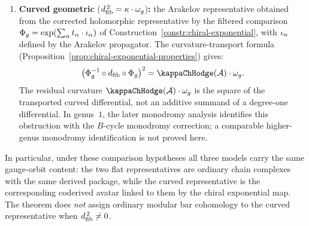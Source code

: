 \begin{theorem}
\begin{enumerate}[label=\textup{(\roman*)}]
\item \textbf{Curved geometric}
 \textup{(}$d_{\mathrm{fib}}^{\,2} = \kappa \cdot \omega_g$\textup{)}\textbf{:}
 the Arakelov representative obtained from the corrected
 holomorphic representative by the filtered comparison
 $\Phi_g = \exp(\sum_\alpha t_\alpha \cdot \iota_\alpha)$ of
 Construction~\textup{\ref{constr:chiral-exponential}},
 with $\iota_\alpha$ defined by the Arakelov propagator.
 The curvature-transport formula
 \textup{(}Proposition~\textup{\ref{prop:chiral-exponential-properties}}\textup{)}
 gives:
 \[
 \bigl(\Phig^{-1} \circ \dfib \circ \Phig\bigr)^2
 = \kappaChHodge(\cA) \cdot \omega_g.
 \]
 The residual curvature $\kappaChHodge(\cA) \cdot \omega_g$ is the
 square of the transported curved differential, not an additive
 summand of a degree-one differential. In genus~$1$, the later
 monodromy analysis identifies this obstruction with the
 $B$-cycle monodromy correction; a comparable higher-genus
 monodromy identification is not proved here.
\end{enumerate}
In particular, under these comparison hypotheses all three models carry
the same gauge-orbit content: the two flat representatives are ordinary
chain complexes with the same derived package, while the curved
representative is the corresponding coderived avatar linked to them by
the chiral exponential map. The theorem does \emph{not} assign ordinary
modular bar cohomology to the curved representative when
$d_{\mathrm{fib}}^{\,2}\neq 0$.
\end{theorem}

